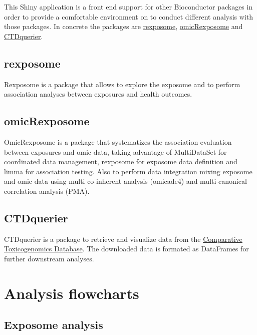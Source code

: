 \documentclass[
]{book}
\begin{document}
This Shiny application is a front end support for other Bioconductor packages in order to provide a comfortable environment on to conduct different analysis with those packages. In concrete the packages are \href{https://www.bioconductor.org/packages/release/bioc/html/rexposome.html}{rexposome}, \href{https://bioconductor.org/packages/release/bioc/html/omicRexposome.html}{omicRexposome} and \href{http://www.bioconductor.org/packages/release/bioc/html/CTDquerier.html}{CTDquerier}.

\hypertarget{rexposome}{%
\section{rexposome}\label{rexposome}}

Rexposome is a package that allows to explore the exposome and to perform association analyses between exposures and health outcomes.

\hypertarget{omicrexposome}{%
\section{omicRexposome}\label{omicrexposome}}

OmicRexposome is a package that systematizes the association evaluation between exposures and omic data, taking advantage of MultiDataSet for coordinated data management, rexposome for exposome data definition and limma for association testing. Also to perform data integration mixing exposome and omic data using multi co-inherent analysis (omicade4) and multi-canonical correlation analysis (PMA).

\hypertarget{ctdquerier}{%
\section{CTDquerier}\label{ctdquerier}}

CTDquerier is a package to retrieve and visualize data from the \href{http://ctdbase.org/}{Comparative Toxicogenomics Database}. The downloaded data is formated as DataFrames for further downstream analyses.

\hypertarget{analysis-flowcharts}{%
\chapter{Analysis flowcharts}\label{analysis-flowcharts}}

\hypertarget{exposome-analysis}{%
\section{Exposome analysis}\label{exposome-analysis}}
\end{document}
